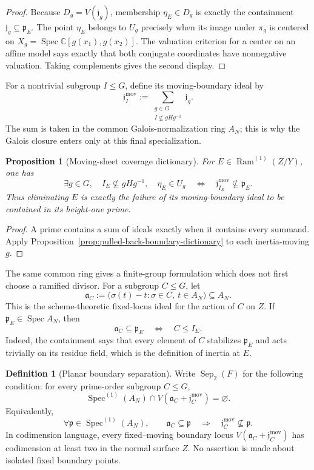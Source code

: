 \documentclass[11pt]{article}
\newtheorem{proposition}[theorem]{Proposition}
\theoremstyle{remark}
\theoremstyle{definition}
\newtheorem{definition}[theorem]{Definition}
\DeclareMathOperator{\Spec}{Spec}
\DeclareMathOperator{\Ram}{Ram}
\newcommand{\C}{\mathbb C}
\begin{document}
\begin{proof}
Because \(D_g=V(\mathfrak j_g)\), membership
\(\eta_E\in D_g\) is exactly the containment
\(\mathfrak j_g\subseteq\mathfrak p_E\).  The point
\(\eta_E\) belongs to \(U_g\) precisely when its image under
\(\pi_g\) is centered on \(X_g=\Spec\C[g(x_1),g(x_2)]\).  The valuation
criterion for a center on an affine model says exactly that both conjugate
coordinates have nonnegative valuation.  Taking complements gives the
second display.
\end{proof}

For a nontrivial subgroup \(I\leq G\), define its moving-boundary ideal by
\[
  \mathfrak j_I^{\mathrm{mov}}
  :=
  \sum_{\substack{g\in G\\I\nsubseteq gHg^{-1}}}\mathfrak j_g.
\]
The sum is taken in the common Galois-normalization ring \(A_N\); this is
why the Galois closure enters only at this final specialization.

\begin{proposition}[Moving-sheet coverage dictionary]
\label{prop:moving-sheet-coverage-dictionary}
For \(E\in\Ram^{(1)}(Z/Y)\), one has
\[
  \exists g\in G,\quad
  I_E\nsubseteq gHg^{-1},\quad \eta_E\in U_g
  \quad\Longleftrightarrow\quad
  \mathfrak j_{I_E}^{\mathrm{mov}}\nsubseteq\mathfrak p_E.
\]
Thus eliminating \(E\) is exactly the failure of its moving-boundary
ideal to be contained in its height-one prime.
\end{proposition}

\begin{proof}
A prime contains a sum of ideals exactly when it contains every summand.
Apply Proposition~\ref{prop:pulled-back-boundary-dictionary} to each
inertia-moving \(g\).
\end{proof}

The same common ring gives a finite-group formulation which does not first
choose a ramified divisor.  For a subgroup \(C\leq G\), let
\[
  \mathfrak a_C
  :=
  \bigl(\sigma(t)-t:\sigma\in C,\ t\in A_N\bigr)
  \subseteq A_N.
\]
This is the scheme-theoretic fixed-locus ideal for the action of \(C\) on
\(Z\).  If \(\mathfrak p_E\in\Spec A_N\), then
\[
  \mathfrak a_C\subseteq\mathfrak p_E
  \quad\Longleftrightarrow\quad
  C\leq I_E.
\]
Indeed, the containment says that every element of \(C\) stabilizes
\(\mathfrak p_E\) and acts trivially on its residue field, which is the
definition of inertia at \(E\).

\begin{definition}[Planar boundary separation]
\label{def:planar-boundary-separation}
Write \(\operatorname{Sep}_2(F)\) for the following condition: for every
prime-order subgroup \(C\leq G\),
\[
  \Spec^{(1)}(A_N)
  \cap
  V\!\left(\mathfrak a_C+\mathfrak j_C^{\mathrm{mov}}\right)
  =\varnothing.
\]
Equivalently,
\[
  \forall\mathfrak p\in\Spec^{(1)}(A_N),\qquad
  \mathfrak a_C\subseteq\mathfrak p
  \quad\Longrightarrow\quad
  \mathfrak j_C^{\mathrm{mov}}\nsubseteq\mathfrak p.
\]
In codimension language, every fixed--moving boundary locus
\(V(\mathfrak a_C+\mathfrak j_C^{\mathrm{mov}})\) has codimension at least
two in the normal surface \(Z\).  No assertion is made about isolated
fixed boundary points.
\end{definition}
\end{document}
